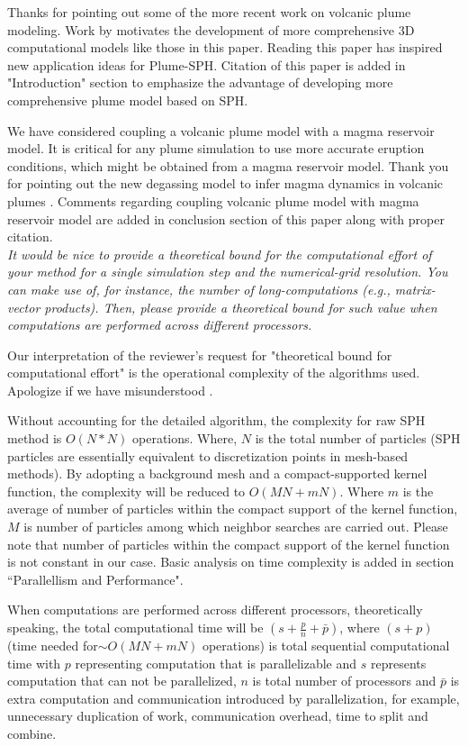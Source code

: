 \documentclass{article}
\begin{document}
Thanks for pointing out some of the more recent work on volcanic plume modeling. 
Work by \citet{costa2018understanding} motivates the development of more comprehensive 3D computational models like those in this paper. Reading this paper has inspired new application ideas for Plume-SPH. {\color{blue} Citation of this paper is added in "Introduction" section} to emphasize the advantage of developing more comprehensive plume model based on SPH.

We have considered coupling a volcanic plume model with a magma reservoir model. It is critical for any plume simulation to use more accurate eruption conditions, which might be obtained from a magma reservoir model. Thank you for pointing out the new degassing model to infer magma dynamics in volcanic plumes \cite{terray2018new}. {\color{blue}Comments regarding coupling volcanic plume model with magma reservoir model are added in conclusion section of this paper along with proper citation.}
\\[3pt]

\textit{It would be nice to provide a theoretical bound for the computational effort of your method for a single simulation step and the numerical-grid resolution. You can make use of, for instance, the number of long-computations (e.g., matrix- vector products). Then, please provide a theoretical bound for such value when computations are performed across different processors.
}

Our interpretation of  the reviewer's request for "theoretical bound for computational effort" is the operational complexity of the algorithms used. Apologize if we  have misunderstood . 

Without accounting for the detailed algorithm, the complexity for raw SPH method is $O(N*N)$ operations. Where, $N$ is the total number of particles (SPH particles are essentially equivalent to discretization points  in mesh-based methods). By adopting a background mesh and a compact-supported kernel function, the  complexity will be reduced to $O(MN+mN)$. Where $m$ is the average of number of particles within the compact support of the kernel function, $M$ is number of particles among which neighbor searches are carried out. Please note that number of particles within the compact support of the kernel function is not constant in our case. {\color{blue} Basic analysis on time complexity is added in section ``Parallellism and Performance".}

When computations are performed across different processors, theoretically speaking, the total computational time will be $(s+\frac{p}{n}+\bar{p})$,  where $(s+p)$(time needed for$ \sim O(MN+mN)$ operations) is total sequential computational time with $p$ representing computation that is parallelizable and $s$ represents computation that can not be parallelized,  $n$ is total number of processors and $\bar{p}$ is extra computation and communication introduced by parallelization, for example, 
unnecessary duplication of work, communication overhead, time to split and combine.
\end{document}
